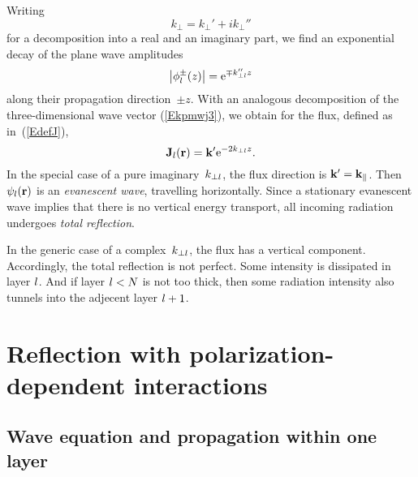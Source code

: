 Writing
\begin{equation}
  k_\perp = k_\perp' + i k_\perp''
\end{equation}
for a decomposition into a real and an imaginary part,
we find an exponential decay of the plane wave amplitudes
\begin{equation}\label{Ephidamp}
  \left|\phi^\pm_l(z)\right|
  = \text{e}^{\mp k_{\perp l}'' z}
\end{equation}
along their propagation direction~$\pm z$.
With an analogous decomposition
of the three-dimensional wave vector (\ref{Ekpmwj3}),
we obtain for the flux, defined as in~(\ref{EdefJ}),
\begin{equation}
  \mathbf{J}_l(\mathbf{r}) = \mathbf{k}' \text{e}^{-2k_{\perp l}z}.
\end{equation}
In the special case of a pure imaginary~$k_{\perp l}$,
the flux direction is $\mathbf{k}'=\mathbf{k}_\parallel$.
Then $\psi_l(\mathbf{r})$ is an \textit{evanescent wave},
%
travelling horizontally.
Since a stationary evanescent wave implies that there is
no vertical energy transport,
all incoming radiation undergoes \textit{total reflection}.
%

In the generic case of a complex~$k_{\perp l}$,
the flux has a vertical component.
Accordingly, the total reflection is not perfect.
Some intensity is dissipated in layer $l$.
%
And if layer $l<N$ is not too thick,
then some radiation intensity also tunnels into the adjecent layer $l+1$.
%


\section{Reflection with polarization-dependent interactions}\label{s:pol}



\subsection{Wave equation and propagation within one layer}

